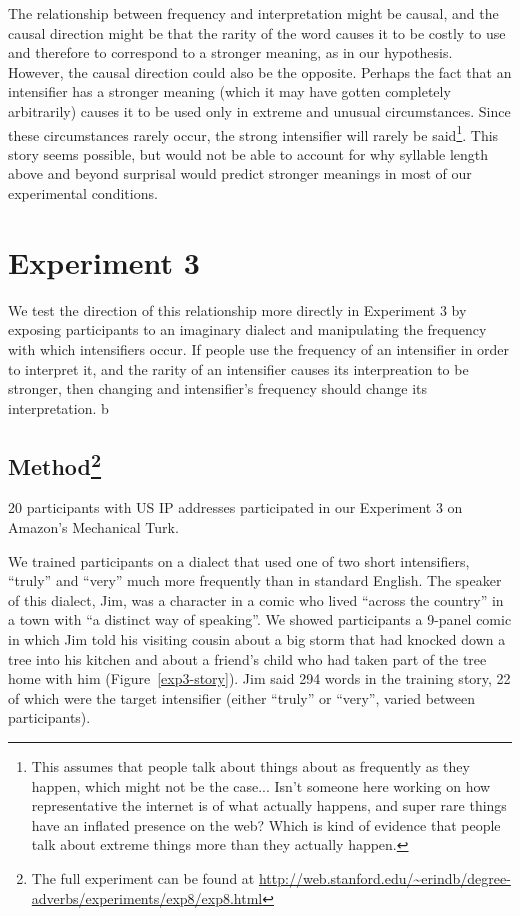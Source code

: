 \documentclass[10pt,letterpaper]{article}
\begin{document}
The relationship between frequency and interpretation might be causal, and the causal direction might be that the rarity of the word causes it to be costly to use and therefore to correspond to a stronger meaning, as in our hypothesis.
However, the causal direction could also be the opposite.
Perhaps the fact that an intensifier has a stronger meaning (which it may have gotten completely arbitrarily) causes it to be used only in extreme and unusual circumstances.
Since these circumstances rarely occur, the strong intensifier will rarely be said\footnote{This assumes that people talk about things about as frequently as they happen, which might not be the case... Isn't someone here working on how representative the internet is of what actually happens, and super rare things have an inflated presence on the web? Which is kind of evidence that people talk about extreme things more than they actually happen.}.
This story seems possible, but would not be able to account for why syllable length above and beyond surprisal would predict stronger meanings in most of our experimental conditions.

\section{Experiment 3}

We test the direction of this relationship more directly in Experiment 3 by exposing participants to an imaginary dialect and manipulating the frequency with which intensifiers occur.
If people use the frequency of an intensifier in order to interpret it, and the rarity of an intensifier causes its interpreation to be stronger, then changing and intensifier's frequency should change its interpretation. b

\subsection{Method\footnote{The full experiment can be found at \url{http://web.stanford.edu/~erindb/degree-adverbs/experiments/exp8/exp8.html}}}


20 participants with US IP addresses participated in our Experiment 3 on Amazon's Mechanical Turk.

We trained participants on a dialect that used one of two short intensifiers, ``truly'' and ``very'' much more frequently than in standard English.
The speaker of this dialect, Jim, was a character in a comic who lived ``across the country'' in a town with ``a distinct way of speaking''.
We showed participants a 9-panel comic in which Jim told his visiting cousin about a big storm that had knocked down a tree into his kitchen and about a friend's child who had taken part of the tree home with him (Figure~\ref{exp3-story}).
Jim said 294 words in the training story, 22 of which were the target intensifier (either ``truly'' or ``very'', varied between participants).
\end{document}
